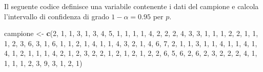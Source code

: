 \documentclass[]{book}
\newenvironment{Shaded}{\begin{snugshade}}{\end{snugshade}}
\newcommand{\KeywordTok}[1]{\textcolor[rgb]{0.13,0.29,0.53}{\textbf{#1}}}
\newcommand{\DecValTok}[1]{\textcolor[rgb]{0.00,0.00,0.81}{#1}}
\newcommand{\StringTok}[1]{\textcolor[rgb]{0.31,0.60,0.02}{#1}}
\newcommand{\NormalTok}[1]{#1}
\begin{document}
Il seguente codice definisce una variabile contenente i dati del
campione e calcola l'intervallo di confidenza di grado
\(1-\alpha = 0.95\) per \(p\).

\begin{Shaded}
\begin{Highlighting}[]
\NormalTok{campione <-}\StringTok{ }\KeywordTok{c}\NormalTok{(}\DecValTok{2}\NormalTok{, }\DecValTok{1}\NormalTok{, }\DecValTok{1}\NormalTok{, }\DecValTok{3}\NormalTok{, }\DecValTok{1}\NormalTok{, }\DecValTok{3}\NormalTok{, }\DecValTok{4}\NormalTok{, }\DecValTok{5}\NormalTok{, }\DecValTok{1}\NormalTok{, }\DecValTok{1}\NormalTok{, }\DecValTok{1}\NormalTok{, }\DecValTok{1}\NormalTok{, }\DecValTok{4}\NormalTok{, }\DecValTok{2}\NormalTok{, }\DecValTok{2}\NormalTok{, }\DecValTok{2}\NormalTok{, }\DecValTok{4}\NormalTok{, }\DecValTok{3}\NormalTok{, }\DecValTok{3}\NormalTok{, }\DecValTok{1}\NormalTok{, }
         \DecValTok{1}\NormalTok{, }\DecValTok{1}\NormalTok{, }\DecValTok{2}\NormalTok{, }\DecValTok{2}\NormalTok{, }\DecValTok{1}\NormalTok{, }\DecValTok{1}\NormalTok{, }\DecValTok{1}\NormalTok{, }\DecValTok{2}\NormalTok{, }\DecValTok{3}\NormalTok{, }\DecValTok{6}\NormalTok{, }\DecValTok{3}\NormalTok{, }\DecValTok{1}\NormalTok{, }\DecValTok{6}\NormalTok{, }\DecValTok{1}\NormalTok{, }\DecValTok{1}\NormalTok{, }\DecValTok{2}\NormalTok{, }\DecValTok{1}\NormalTok{, }\DecValTok{4}\NormalTok{, }\DecValTok{1}\NormalTok{, }\DecValTok{1}\NormalTok{, }
         \DecValTok{4}\NormalTok{, }\DecValTok{3}\NormalTok{, }\DecValTok{2}\NormalTok{, }\DecValTok{1}\NormalTok{, }\DecValTok{4}\NormalTok{, }\DecValTok{6}\NormalTok{, }\DecValTok{7}\NormalTok{, }\DecValTok{2}\NormalTok{, }\DecValTok{1}\NormalTok{, }\DecValTok{1}\NormalTok{, }\DecValTok{3}\NormalTok{, }\DecValTok{1}\NormalTok{, }\DecValTok{1}\NormalTok{, }\DecValTok{4}\NormalTok{, }\DecValTok{1}\NormalTok{, }\DecValTok{1}\NormalTok{, }\DecValTok{4}\NormalTok{, }\DecValTok{1}\NormalTok{, }\DecValTok{4}\NormalTok{, }\DecValTok{1}\NormalTok{, }
         \DecValTok{2}\NormalTok{, }\DecValTok{1}\NormalTok{, }\DecValTok{1}\NormalTok{, }\DecValTok{1}\NormalTok{, }\DecValTok{4}\NormalTok{, }\DecValTok{2}\NormalTok{, }\DecValTok{1}\NormalTok{, }\DecValTok{2}\NormalTok{, }\DecValTok{3}\NormalTok{, }\DecValTok{2}\NormalTok{, }\DecValTok{2}\NormalTok{, }\DecValTok{1}\NormalTok{, }\DecValTok{2}\NormalTok{, }\DecValTok{1}\NormalTok{, }\DecValTok{2}\NormalTok{, }\DecValTok{1}\NormalTok{, }\DecValTok{2}\NormalTok{, }\DecValTok{2}\NormalTok{, }\DecValTok{6}\NormalTok{, }\DecValTok{5}\NormalTok{, }
         \DecValTok{6}\NormalTok{, }\DecValTok{2}\NormalTok{, }\DecValTok{6}\NormalTok{, }\DecValTok{2}\NormalTok{, }\DecValTok{3}\NormalTok{, }\DecValTok{2}\NormalTok{, }\DecValTok{2}\NormalTok{, }\DecValTok{2}\NormalTok{, }\DecValTok{4}\NormalTok{, }\DecValTok{1}\NormalTok{, }\DecValTok{1}\NormalTok{, }\DecValTok{1}\NormalTok{, }\DecValTok{1}\NormalTok{, }\DecValTok{2}\NormalTok{, }\DecValTok{3}\NormalTok{, }\DecValTok{9}\NormalTok{, }\DecValTok{3}\NormalTok{, }\DecValTok{1}\NormalTok{, }\DecValTok{2}\NormalTok{, }\DecValTok{1}\NormalTok{)}


\end{Highlighting}
\end{Shaded}
\end{document}
